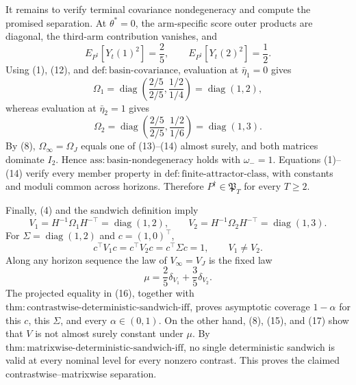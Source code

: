 It remains to verify terminal covariance nondegeneracy and compute the promised separation. At \(\theta^*=0\), the arm-specific score outer products are diagonal, the third-arm contribution vanishes, and
\[
 E_{P^{\dagger}}[Y_t(1)^2]=\frac25,
 \qquad
 E_{P^{\dagger}}[Y_t(2)^2]=\frac12.
 \tag{12}
\]
Using (1), (12), and \(\mathrm{def:basin\text{-}covariance}\), evaluation at \(\bar\eta_1=0\) gives
\[
 \Omega_1
 =\operatorname{diag}\left(\frac{2/5}{2/5},\frac{1/2}{1/4}\right)
 =\operatorname{diag}(1,2),
 \tag{13}
\]
whereas evaluation at \(\bar\eta_2=1\) gives
\[
 \Omega_2
 =\operatorname{diag}\left(\frac{2/5}{2/5},\frac{1/2}{1/6}\right)
 =\operatorname{diag}(1,3).
 \tag{14}
\]
By (8), \(\Omega_\infty=\Omega_J\) equals one of (13)--(14) almost surely, and both matrices dominate \(I_2\). Hence \(\mathrm{ass:basin\text{-}nondegeneracy}\) holds with \(\omega_-=1\). Equations (1)--(14) verify every member property in \(\mathrm{def:finite\text{-}attractor\text{-}class}\), with constants and moduli common across horizons. Therefore \(P^{\dagger}\in\mathfrak P_T\) for every \(T\ge2\).

Finally, (4) and the sandwich definition imply
\[
 V_1=H^{-1}\Omega_1H^{-\top}=\operatorname{diag}(1,2),
 \qquad
 V_2=H^{-1}\Omega_2H^{-\top}=\operatorname{diag}(1,3).
 \tag{15}
\]
For \(\Sigma=\operatorname{diag}(1,2)\) and \(c=(1,0)^\top\),
\[
 c^\top V_1c=c^\top V_2c=c^\top\Sigma c=1,
 \qquad V_1\ne V_2.
 \tag{16}
\]
Along any horizon sequence the law of \(V_\infty=V_J\) is the fixed law
\[
 \mu=\frac25\delta_{V_1}+\frac35\delta_{V_2}.
 \tag{17}
\]
The projected equality in (16), together with \(\mathrm{thm:contrastwise\text{-}deterministic\text{-}sandwich\text{-}iff}\), proves asymptotic coverage \(1-\alpha\) for this \(c\), this \(\Sigma\), and every \(\alpha\in(0,1)\). On the other hand, (8), (15), and (17) show that \(V\) is not almost surely constant under \(\mu\). By \(\mathrm{thm:matrixwise\text{-}deterministic\text{-}sandwich\text{-}iff}\), no single deterministic sandwich is valid at every nominal level for every nonzero contrast. This proves the claimed contrastwise--matrixwise separation.